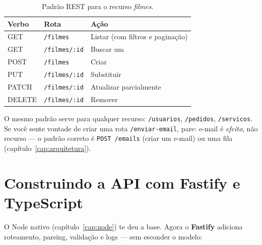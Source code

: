 \begin{table}[h]
\centering
\small
\caption{Padrão REST para o recurso \emph{filmes}.}
\label{tab:rest}
\begin{tabularx}{\textwidth}{@{}l l X@{}}
\toprule
\textbf{Verbo} & \textbf{Rota} & \textbf{Ação} \\
\midrule
GET & \texttt{/filmes} & Listar (com filtros e paginação\index{paginação}) \\
GET & \texttt{/filmes/:id} & Buscar um \\
POST & \texttt{/filmes} & Criar \\
PUT & \texttt{/filmes/:id} & Substituir \\
PATCH & \texttt{/filmes/:id} & Atualizar parcialmente \\
DELETE & \texttt{/filmes/:id} & Remover \\
\bottomrule
\end{tabularx}
\end{table}

\begin{caixadica}
O mesmo padrão serve para qualquer recurso: \texttt{/usuarios},
\texttt{/pedidos}, \texttt{/servicos}. Se você sente vontade de criar uma
rota \texttt{/enviar-email}, pare: e-mail é \emph{efeito}, não recurso — o
padrão correto é \texttt{POST /emails} (criar um e-mail) ou uma fila
(capítulo~\ref{cap:arquitetura}).
\end{caixadica}

\section{Construindo a API com Fastify e TypeScript}

O Node nativo (capítulo~\ref{cap:node}) te deu a base. Agora o \textbf{Fastify}
adiciona roteamento, parsing, validação e logs — sem esconder o modelo:

